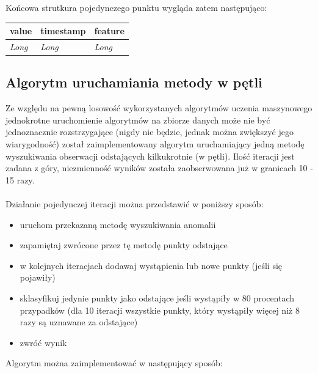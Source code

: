 \documentclass[eng,printmode]{mgr}
\begin{document}
Końcowa strutkura pojedynczego punktu wygląda zatem następująco:
\\
\begingroup
\fontsize{10pt}{12pt}\selectfont

\begin{tabu} to 0.9\textwidth { | X[l] | X[l] | X[l] |}
\hline
\textbf{value} & \textbf{timestamp} & \textbf{feature} \\
\hline
\textit{Long}  & \textit{Long}  & \textit{Long} \\
\hline
\end{tabu}
\endgroup

\subsection{Algorytm uruchamiania metody w pętli}
\label{sec:looping}
Ze względu na pewną losowość wykorzystanych algorytmów uczenia maszynowego jednokrotne uruchomienie algorytmów na zbiorze danych może nie być jednoznacznie rozstrzygające (nigdy nie będzie, jednak można zwiększyć jego wiarygodność) został zaimplementowany algorytm uruchamiający jedną metodę wyszukiwania obserwacji odstających kilkukrotnie (w pętli). Ilość iteracji jest zadana z góry, niezmienność wyników została zaobserwowana już w granicach 10 - 15 razy. 
\\\\
Działanie pojedynczej iteracji można przedstawić w poniższy sposób:

\begin{itemize}
  \item uruchom przekazaną metodę wyszukiwania anomalii
  \item zapamiętaj zwrócone przez tę metodę punkty odstające
  \item w kolejnych iteracjach dodawaj wystąpienia lub nowe punkty (jeśli się pojawiły)
  \item sklasyfikuj jedynie punkty jako odstające jeśli wystąpiły w 80 procentach przypadków (dla 10 iteracji wszystkie punkty, który wystąpiły więcej niż 8 razy są uznawane za odstające)
  \item zwróć wynik
\end{itemize}

Algorytm można zaimplementować w następujący sposób:
\end{document}
